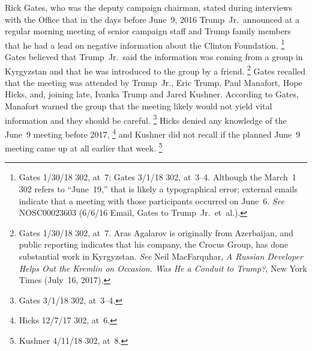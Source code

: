 Rick Gates, who was the deputy campaign chairman, stated during interviews with the Office that in the days before June~9, 2016 Trump~Jr.\ announced at a regular morning meeting of senior campaign staff and Trump family members that he had a lead on negative information about the Clinton Foundation.%
\footnote{Gates 1/30/18 302, at~7;
Gates 3/1/18 302, at~3--4.
Although the March~1 302 refers to ``June~19,'' that is likely a typographical error;
external emails indicate that a meeting with those participants occurred on June~6.
\textit{See} NOSC00023603 (6/6/16 Email, Gates to Trump~Jr.\ et~al.).}
Gates believed that Trump~Jr.\ said the information was coming from a group in Kyrgyzstan and that he was introduced to the group by a friend.%
\footnote{Gates 1/30/18 302, at~7.
Aras Agalarov is originally from Azerbaijan, and public reporting indicates that his company, the Crocus Group, has done substantial work in Kyrgyzstan.
\textit{See} Neil MacFarquhar, \textit{A Russian Developer Helps Out the Kremlin on Occasion. Was He a Conduit to Trump?}, New York Times (July~16, 2017).}
Gates recalled that the meeting was attended by Trump~Jr., Eric Trump, Paul Manafort, Hope Hicks, and, joining late, Ivanka Trump and Jared Kushner.
According to Gates, Manafort warned the group that the meeting likely would not yield vital information and they should be careful.%
\footnote{Gates 3/1/18 302, at~3--4.}
Hicks denied any knowledge of the June~9 meeting before 2017,%
\footnote{Hicks 12/7/17 302, at~6.}
and Kushner did not recall if the planned June~9 meeting came up at all earlier that week.%
\footnote{Kushner 4/11/18 302, at~8.}

